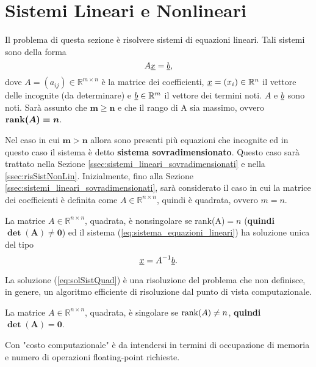 \section{Sistemi Lineari e Nonlineari}
Il problema di questa sezione è risolvere sistemi di equazioni lineari. Tali sistemi sono della forma 
\begin{equation}\label{eq:sistema_equazioni_lineari}
    A\uline{x}=\uline b,
\end{equation}
dove $A=(a_{ij})\in{\mathbb R^{m\times n}}$ è la matrice dei coefficienti, $\uline x=(x_i)\in\mathbb R^n$ il vettore delle incognite (da determinare) e $\uline b\in\mathbb R^m$ il vettore dei termini noti. $A$ e $\uline b$ sono noti. Sarà assunto che $\boldsymbol{m\geq n}$ e che il rango di A sia massimo, ovvero $\boldsymbol{\operatorname{rank}(A)=n}$.

Nel caso in cui $\boldsymbol{m>n}$ allora sono presenti più equazioni che incognite ed in questo caso il sistema è detto \textbf{sistema sovradimensionato}. Questo caso sarà trattato nella Sezione \ref{ssec:sistemi_lineari_sovradimensionati} e nella \ref{ssec:risSistNonLin}. Inizialmente, fino alla Sezione \ref{ssec:sistemi_lineari_sovradimensionati}, sarà considerato il caso in cui la matrice dei coefficienti è definita come $A\in\mathbb R^{n\times n}$, quindi è quadrata, ovvero $m=n$.

\begin{definition}
    La matrice $A\in\mathbb R^{n\times n}$, quadrata, è nonsingolare se \gls{rank(A)}$=n$ (\textbf{quindi} $\boldsymbol{\det(A)\neq 0}$) ed il sistema (\ref{eq:sistema_equazioni_lineari}) ha soluzione unica del tipo
    \begin{equation}\label{eq:solSistQuad}
        \uline x = A^{-1} \uline b.
    \end{equation}
\end{definition}
La soluzione (\ref{eq:solSistQuad}) è una risoluzione del problema che non definisce, in genere, un algoritmo efficiente di risoluzione dal punto di vista computazionale.

\begin{definition}
	La matrice $A\in\mathbb R^{n\times n}$, quadrata, è singolare se $\operatorname{rank}(A)\neq n$, \textbf{quindi} $\boldsymbol{\det(A) = 0}$.
\end{definition}

\begin{remark}
    Con "costo computazionale" è da intendersi in termini di occupazione di memoria e numero di operazioni floating-point richieste.
\end{remark}

